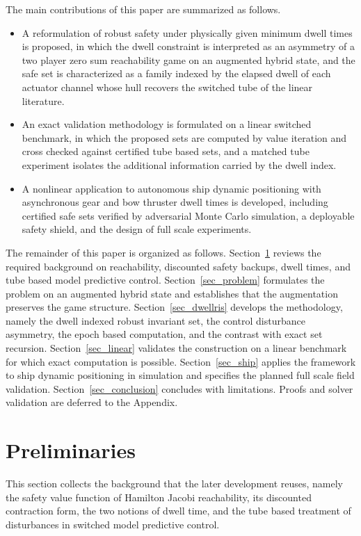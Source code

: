 \documentclass[journal]{IEEEtran}
\begin{document}
The main contributions of this paper are summarized as follows.
\begin{itemize}
\item A reformulation of robust safety under physically given minimum dwell times is proposed, in which the dwell constraint is interpreted as an asymmetry of a two player zero sum reachability game on an augmented hybrid state, and the safe set is characterized as a family indexed by the elapsed dwell of each actuator channel whose hull recovers the switched tube of the linear literature.
\item An exact validation methodology is formulated on a linear switched benchmark, in which the proposed sets are computed by value iteration and cross checked against certified tube based sets, and a matched tube experiment isolates the additional information carried by the dwell index.
\item A nonlinear application to autonomous ship dynamic positioning with asynchronous gear and bow thruster dwell times is developed, including certified safe sets verified by adversarial Monte Carlo simulation, a deployable safety shield, and the design of full scale experiments.
\end{itemize}

The remainder of this paper is organized as follows. Section~\ref{sec_prelim} reviews the required background on reachability, discounted safety backups, dwell times, and tube based model predictive control. Section~\ref{sec_problem} formulates the problem on an augmented hybrid state and establishes that the augmentation preserves the game structure. Section~\ref{sec_dwellris} develops the methodology, namely the dwell indexed robust invariant set, the control disturbance asymmetry, the epoch based computation, and the contrast with exact set recursion. Section~\ref{sec_linear} validates the construction on a linear benchmark for which exact computation is possible. Section~\ref{sec_ship} applies the framework to ship dynamic positioning in simulation and specifies the planned full scale field validation. Section~\ref{sec_conclusion} concludes with limitations. Proofs and solver validation are deferred to the Appendix.

\section{Preliminaries}\label{sec_prelim}

This section collects the background that the later development reuses, namely the safety value function of Hamilton Jacobi reachability, its discounted contraction form, the two notions of dwell time, and the tube based treatment of disturbances in switched model predictive control.
\end{document}
